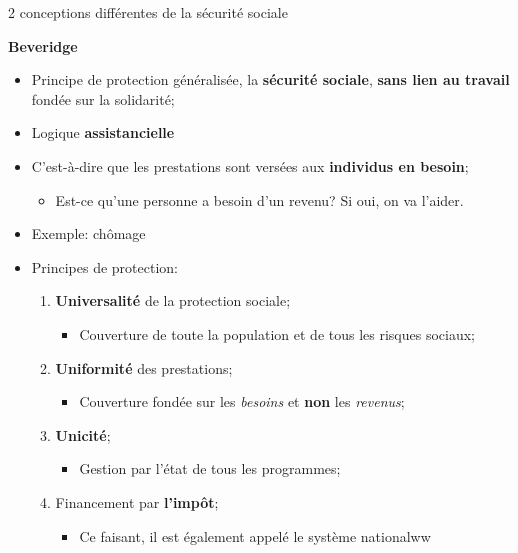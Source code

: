 \documentclass[10pt, french]{article}
\begin{document}
\begin{multicols*}{3}
\begin{conceptgen}{2 conceptions différentes de la sécurité sociale}
\begin{center}
\textbf{Beveridge}
\end{center}
\begin{itemize}[leftmargin = *]
	\item	Principe de protection généralisée, la \textbf{sécurité sociale}, \textbf{sans lien au travail} fondée sur la solidarité;
	\item	Logique \textbf{assistancielle}
	\item[]	C'est-à-dire que les prestations sont versées aux \textbf{individus en besoin};
		\begin{itemize}
		\item	Est-ce qu'une personne a besoin d'un revenu? Si oui, on va l'aider.
		\end{itemize}
	\item	Exemple: chômage
	\item	Principes de protection:
		\begin{enumerate}
		\item	\textbf{Universalité} de la protection sociale;
			\begin{itemize}
			\item	Couverture de toute la population et de tous les risques sociaux;
			\end{itemize}
		\item	\textbf{Uniformité} des prestations;
			\begin{itemize}
			\item	Couverture fondée sur les \textit{besoins} et \textbf{non} les \textit{revenus};
			\end{itemize}
		\item	\textbf{Unicité};
			\begin{itemize}
			\item	Gestion par l'état de tous les programmes;
			\end{itemize}	
		\item	Financement par \textbf{l'impôt};
			\begin{itemize}
			\item	Ce faisant, il est également appelé le système \og nationalww \fg{} 
			\end{itemize}
		\end{enumerate}
\end{itemize}
\end{conceptgen}


\end{multicols*}
\end{document}
